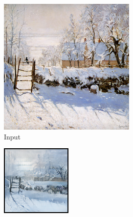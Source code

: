 \documentclass{article}
\begin{document}
\begin{figure}[H]
    \begin{subfigure}{.112\textwidth}
        \centering
        \includegraphics[width=\linewidth]{00855.jpg}
        \caption{Input}
    \end{subfigure}%
    \begin{subfigure}{.112\textwidth}
        \centering
        \includegraphics[width=\linewidth]{0075.png}

\end{subfigure}
\end{figure}
\end{document}
